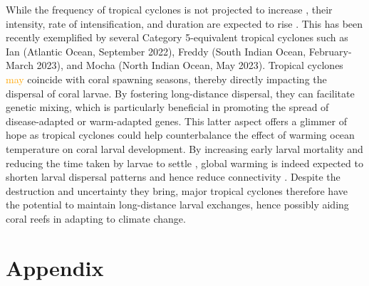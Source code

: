 \documentclass[fleqn,10pt]{wlscirep}
\newcommand{\emphc}[1]{\emph{\textcolor{red}{#1}}}
\newcommand{\modif}[1]{\textcolor{orange}{#1}}
\begin{document}
While the frequency of tropical cyclones is not projected to increase \citep{walsh2019tropical}, their intensity, rate of intensification, and duration are expected to rise \citep{bhatia2022potential}. This has been recently exemplified by several Category 5-equivalent tropical cyclones such as Ian (Atlantic Ocean, September 2022), Freddy (South Indian Ocean, February-March 2023), and Mocha (North Indian Ocean, May 2023). Tropical cyclones  \modif{may} coincide with coral spawning seasons, thereby directly impacting the dispersal of coral larvae. By fostering long-distance dispersal, they can facilitate genetic mixing, which is particularly beneficial in promoting the spread of disease-adapted or warm-adapted genes. This latter aspect offers a glimmer of hope as tropical cyclones could help counterbalance the effect of warming ocean temperature on coral larval development. By increasing early larval mortality and reducing the time taken by larvae to settle \citep{nozawa2007effects, heyward2010plasticity}, global warming is indeed expected to shorten larval dispersal patterns and hence reduce connectivity \citep{Figueiredo2022Jan}. Despite the destruction and uncertainty they bring, major tropical cyclones therefore have the potential to maintain long-distance larval exchanges, hence possibly aiding coral reefs in adapting to climate change.



\section*{Appendix}
\end{document}

